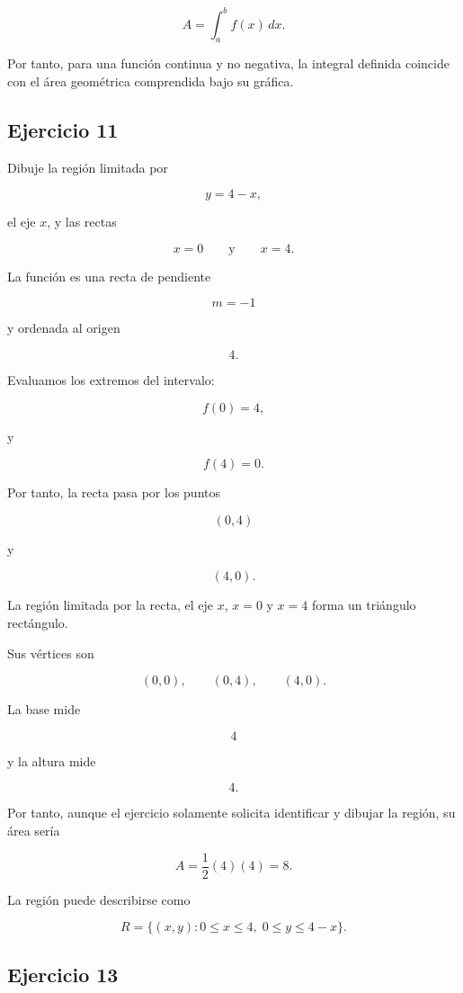\documentclass[12pt]{article}
\begin{document}
\[
\boxed{
A=
\int_a^b f(x)\,dx
}.
\]

Por tanto, para una función continua y no negativa, la integral definida
coincide con el área geométrica comprendida bajo su gráfica.

\subsection*{Ejercicio 11}

Dibuje la región limitada por

\[
y=4-x,
\]

el eje \(x\), y las rectas

\[
x=0
\qquad\text{y}\qquad
x=4.
\]

La función es una recta de pendiente

\[
m=-1
\]

y ordenada al origen

\[
4.
\]

Evaluamos los extremos del intervalo:

\[
f(0)=4,
\]

y

\[
f(4)=0.
\]

Por tanto, la recta pasa por los puntos

\[
(0,4)
\]

y

\[
(4,0).
\]

La región limitada por la recta, el eje \(x\), \(x=0\) y \(x=4\)
forma un triángulo rectángulo.

Sus vértices son

\[
(0,0),\qquad
(0,4),\qquad
(4,0).
\]

La base mide

\[
4
\]

y la altura mide

\[
4.
\]

Por tanto, aunque el ejercicio solamente solicita identificar y dibujar
la región, su área sería

\[
A=
\frac12(4)(4)
=
8.
\]

La región puede describirse como

\[
\boxed{
R=
\{(x,y):0\leq x\leq4,\;0\leq y\leq4-x\}
}.
\]

\subsection*{Ejercicio 13}
\end{document}

